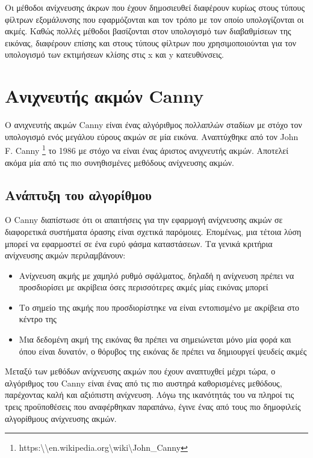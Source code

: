 Οι μέθοδοι ανίχνευσης άκρων που έχουν δημοσιευθεί διαφέρουν κυρίως στους τύπους φίλτρων εξομάλυνσης που εφαρμόζονται και τον τρόπο με τον οποίο υπολογίζονται οι ακμές. Καθώς πολλές μέθοδοι βασίζονται στον υπολογισμό των διαβαθμίσεων της εικόνας, διαφέρουν επίσης και στους τύπους φίλτρων που χρησιμοποιούνται για τον υπολογισμό των εκτιμήσεων κλίσης στις x και y κατευθύνσεις.

\section{Ανιχνευτής ακμών Canny}

Ο ανιχνευτής ακμών Canny είναι ένας αλγόριθμος πολλαπλών σταδίων με στόχο τον υπολογισμό ενός μεγάλου εύρους ακμών σε μία εικόνα. Αναπτύχθηκε από τον John F. Canny \footnote{https:\textbackslash\textbackslash en.wikipedia.org\textbackslash wiki\textbackslash John\_Canny} το 1986 με στόχο να είναι ένας άριστος ανιχνευτής ακμών. Αποτελεί ακόμα μία από τις πιο συνηθισμένες μεθόδους ανίχνευσης ακμών.
\subsection{Ανάπτυξη του αλγορίθμου}

Ο Canny διαπίστωσε ότι οι απαιτήσεις για την εφαρμογή ανίχνευσης ακμών σε διαφορετικά συστήματα όρασης είναι σχετικά παρόμοιες. Επομένως, μια τέτοια λύση μπορεί να εφαρμοστεί σε ένα ευρύ φάσμα καταστάσεων.
\newpage \noindent Τα γενικά κριτήρια ανίχνευσης ακμών περιλαμβάνουν:
\begin{itemize}
	\item Ανίχνευση ακμής με χαμηλό ρυθμό σφάλματος, δηλαδή η ανίχνευση πρέπει να προσδιορίσει με ακρίβεια όσες περισσότερες ακμές μίας εικόνας μπορεί
	\item Το σημείο της ακμής που προσδιορίστηκε να είναι εντοπισμένο με ακρίβεια στο κέντρο της
	\item Μια δεδομένη ακμή της εικόνας θα πρέπει να σημειώνεται μόνο μία φορά και όπου είναι δυνατόν, ο θόρυβος της εικόνας δε πρέπει να δημιουργεί ψευδείς ακμές \\
\end{itemize}

Μεταξύ των μεθόδων ανίχνευσης ακμών που έχουν αναπτυχθεί μέχρι τώρα, ο αλγόριθμος του Canny είναι ένας από τις πιο αυστηρά καθορισμένες μεθόδους, παρέχοντας καλή και αξιόπιστη ανίχνευση. Λόγω της ικανότητάς του να πληροί τις τρεις προϋποθέσεις που αναφέρθηκαν παραπάνω, έγινε ένας από τους πιο δημοφιλείς αλγορίθμους ανίχνευσης ακμών.

